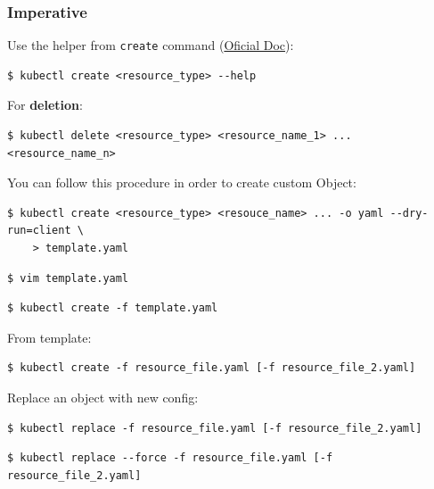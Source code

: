 \documentclass{article}
\newenvironment{blocktemplateII}[1]{%
    \tcolorbox[beamer,%
    noparskip,breakable,
    colframe=Green,%
    colbacklower=LimeGreen!75!LightGreen,%
    title=#1]}%
    {\endtcolorbox}
\newenvironment{codetemplate}[1][]{%
  \mybasecolorbox[#1]
  \itshape
}{%
  \endmybasecolorbox
}
\begin{document}
\subsubsection{Imperative}
Use the helper from \verb|create| command (\href{https://jamesdefabia.github.io/docs/user-guide/kubectl/kubectl_create/}{Oficial Doc}):
\begin{codetemplate}
\begin{verbatim}
$ kubectl create <resource_type> --help
\end{verbatim}
\end{codetemplate}

For \textbf{deletion}:
\begin{codetemplate}
\begin{verbatim}
$ kubectl delete <resource_type> <resource_name_1> ... <resource_name_n>
\end{verbatim}
\end{codetemplate}

\begin{blocktemplateII}{NOTE}
You can follow this procedure in order to create custom Object:
\begin{codetemplate}{}
\begin{verbatim}
$ kubectl create <resource_type> <resouce_name> ... -o yaml --dry-run=client \ 
    > template.yaml
\end{verbatim}
\end{codetemplate}
\begin{codetemplate}{}
\begin{verbatim}
$ vim template.yaml
\end{verbatim}
\end{codetemplate}
\begin{codetemplate}{}
\begin{verbatim}
$ kubectl create -f template.yaml
\end{verbatim}
\end{codetemplate}
\end{blocktemplateII}

From template:
\begin{codetemplate}
\begin{verbatim}
$ kubectl create -f resource_file.yaml [-f resource_file_2.yaml]
\end{verbatim}
\end{codetemplate}

Replace an object with new config:
\begin{codetemplate}
\begin{verbatim}
$ kubectl replace -f resource_file.yaml [-f resource_file_2.yaml]
\end{verbatim}
\end{codetemplate}
\begin{codetemplate}
\begin{verbatim}
$ kubectl replace --force -f resource_file.yaml [-f resource_file_2.yaml]
\end{verbatim}
\end{codetemplate}
\end{document}
